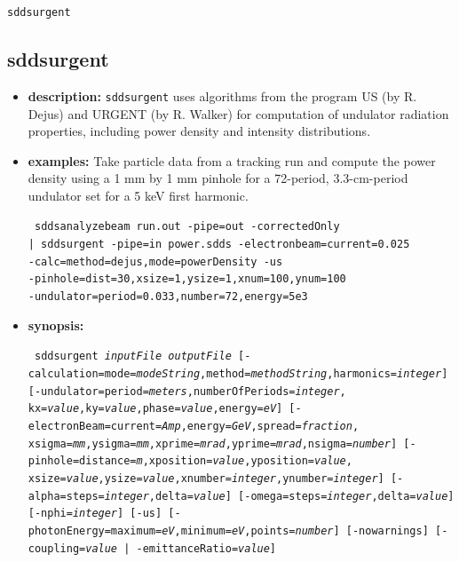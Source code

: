 \documentclass[11pt]{article}
\begin{document}
\newpage
\newpage
\begin{center}{\Large\verb|sddsurgent|}\end{center}
\subsection{sddsurgent}

\begin{itemize}
\item {\bf description:} {\tt sddsurgent} uses algorithms from the program
US (by R. Dejus) and URGENT (by R. Walker) for computation of undulator
radiation properties, including power density and intensity distributions.

\item {\bf examples:}
Take particle data from a tracking run and compute the power density using a 1 mm by 1 mm pinhole
for a 72-period, 3.3-cm-period undulator set for a 5 keV first harmonic.
\begin{flushleft}{\tt
sddsanalyzebeam run.out -pipe=out -correctedOnly \\ 
 | sddsurgent -pipe=in power.sdds -electronbeam=current=0.025 \\
 -calc=method=dejus,mode=powerDensity -us \\
 -pinhole=dist=30,xsize=1,ysize=1,xnum=100,ynum=100 \\
 -undulator=period=0.033,number=72,energy=5e3
}\end{flushleft}

\item {\bf synopsis:}
\begin{flushleft}{\tt
sddsurgent {\em inputFile} {\em outputFile}
    [-calculation=mode={\em modeString},method={\em methodString},harmonics={\em integer}] 
    [-undulator=period={\em meters},numberOfPeriods={\em integer},
      kx={\em value},ky={\em value},phase={\em value},energy={\em eV}] 
    [-electronBeam=current={\em Amp},energy={\em GeV},spread={\em fraction},
      xsigma={\em mm},ysigma={\em mm},xprime={\em mrad},yprime={\em mrad},nsigma={\em number}] 
    [-pinhole=distance={\em m},xposition={\em value},yposition={\em value},
      xsize={\em value},ysize={\em value},xnumber={\em integer},ynumber={\em integer}]
    [-alpha=steps={\em integer},delta={\em value}] 
    [-omega=steps={\em integer},delta={\em value}] [-nphi={\em integer}] 
    [-us] [-photonEnergy=maximum={\em eV},minimum={\em eV},points={\em number}]
    [-nowarnings] [-coupling={\em value} | -emittanceRatio={\em value}] 
}\end{flushleft}


\end{itemize}
\end{document}
